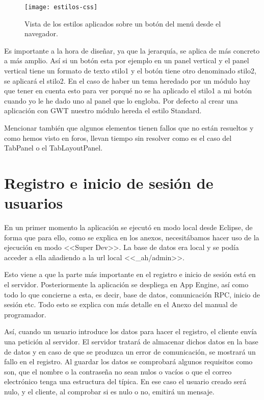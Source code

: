 \begin{figure}[h]
\centering
\texttt{[image: estilos-css]}
\caption{Vista de los estilos aplicados sobre un botón del menú desde el navegador.}
\label{fig:5.1}
\end{figure}

Es importante a la hora de diseñar, ya que la jerarquía, se aplica de más concreto a más amplio. Así si un botón esta por ejemplo en un panel vertical y el panel vertical tiene un formato de texto stilo1 y el botón tiene otro denominado stilo2, se aplicará el stilo2. En el caso de haber un tema heredado por un módulo hay que tener en cuenta esto para ver porqué no se ha aplicado el stilo1 a mi botón cuando yo le he dado uno al panel que lo engloba. Por defecto al crear una aplicación con GWT nuestro módulo hereda el estilo Standard. 

Mencionar también que algunos elementos tienen fallos que no están resueltos y como hemos visto en foros, llevan tiempo sin resolver como es el caso del TabPanel o el TabLayoutPanel.

\section{Registro e inicio de sesión de usuarios}

En un primer momento la aplicación se ejecutó en modo local desde Eclipse, de forma que para ello, como se explica en los anexos, necesitábamos hacer uso de la ejecución en modo <<Super Dev>>. La base de datos era local y se podía acceder a ella añadiendo a la url local <<\_ah/admin>>.

Esto viene a que la parte más importante en el registro e inicio de sesión está en el servidor. Posteriormente la aplicación se despliega en  App Engine, así como todo lo que concierne a esta, es decir, base de datos, comunicación RPC, inicio de sesión etc. Todo esto se explica con más detalle en el Anexo del manual de programador.

Así, cuando un usuario introduce los datos para hacer el registro, el cliente envía una petición al servidor. El servidor tratará de almacenar dichos datos en la base de datos y en caso de que se produzca un error de comunicación, se mostrará un fallo en el registro. Al guardar los datos se comprobará algunos requisitos como son, que el nombre o la contraseña no sean nulos o vacíos o que el correo electrónico tenga una estructura del típica. En ese caso el usuario creado será nulo, y el cliente, al comprobar si es nulo o no, emitirá un mensaje. 


